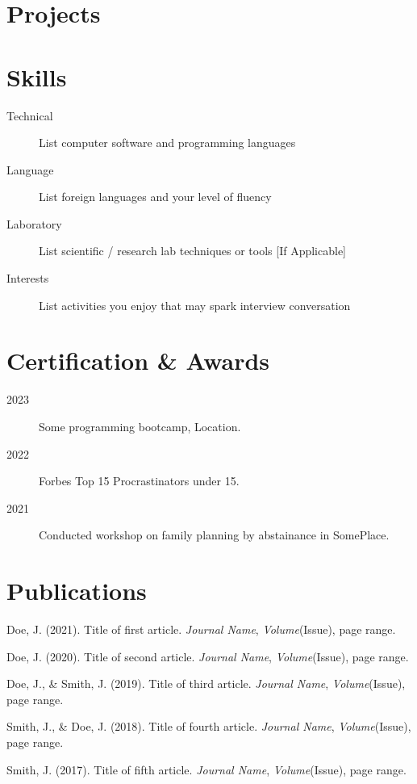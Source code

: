 \documentclass[11pt]{article} %
\begin{document}
\section{Projects}


\section{Skills}
\begin{description}
    \item[Technical] List computer software and programming languages 
    \item[Language] List foreign languages and your level of fluency
    \item[Laboratory] List scientific / research lab techniques or tools [If Applicable]
    \item[Interests] List activities you enjoy that may spark interview conversation
\end{description}


\section{Certification \& Awards}
\begin{description}
    \item [2023] Some programming bootcamp, Location.
    \item [2022] Forbes Top 15 Procrastinators under 15.
    \item [2021] Conducted workshop on family planning by abstainance in SomePlace.
\end{description}


\section{Publications}
\begin{enumerate}[label={[\texttt{\arabic*}]}, align=left]
    \item Doe, J. (2021). Title of first article. \emph{Journal Name}, \emph{Volume}(Issue), page range.
    \item Doe, J. (2020). Title of second article. \emph{Journal Name}, \emph{Volume}(Issue), page range.
    \item Doe, J., \& Smith, J. (2019). Title of third article. \emph{Journal Name}, \emph{Volume}(Issue), page range.
    \item Smith, J., \& Doe, J. (2018). Title of fourth article. \emph{Journal Name}, \emph{Volume}(Issue), page range.
    \item Smith, J. (2017). Title of fifth article. \emph{Journal Name}, \emph{Volume}(Issue), page range.
\end{enumerate}
\end{document}
